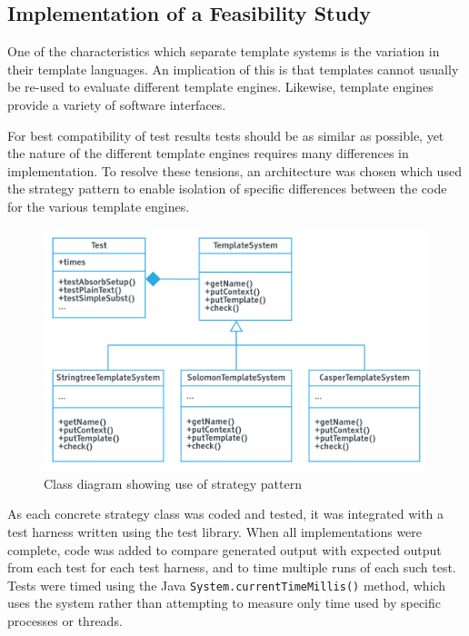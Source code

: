 \subsection{Implementation of a Feasibility Study}

One of the characteristics which separate template systems is the variation in their template languages. An implication of this is that templates cannot usually be re-used to evaluate different template engines. Likewise, template engines provide a variety of software interfaces.

For best compatibility of test results tests should be as similar as possible, yet the nature of the different template engines requires many differences in implementation. To resolve these tensions, an architecture was chosen which used the strategy pattern \citep{Gamma1994} to enable isolation of specific differences between the code for the various template engines.

\begin{figure}[ht!]
\centering
\includegraphics[width=130mm]{Figures/classes.png}
\caption{Class diagram showing use of strategy pattern}
\end{figure}

As each concrete strategy class was coded and tested, it was integrated with a test harness written using the \cite{JUnit2018} test library. When all implementations were complete, code was added to compare generated output with expected output from each test for each test harness, and to time multiple runs of each such test. Tests were timed using the Java \verb!System.currentTimeMillis()! method, which uses the system  rather than attempting to measure only time used by specific processes or threads.

